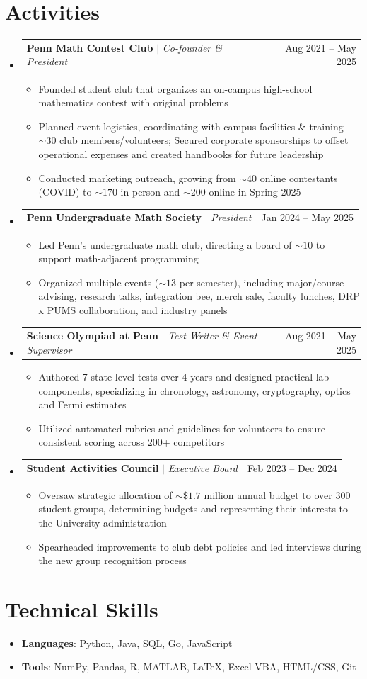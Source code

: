 \documentclass[letterpaper, 11pt]{article}
\makeatletter
\newcommand{\resumeItem}[1]{\item\small{#1 \vspace{-1.5pt}}}
\newcommand{\resumeProjectHeading}[2]{
	\item\begin{tabular*}{0.97\textwidth}{l@{\extracolsep{\fill}}r}
		\small#1 & #2 \\\end{tabular*}\vspace{-7pt}
}
\newcommand{\resumeSubHeadingListStart}{\begin{itemize}[leftmargin=0.05in, label={}]}
\newcommand{\resumeSubHeadingListEnd}{\end{itemize}}
\newcommand{\resumeItemListStart}{\begin{itemize}[leftmargin=0.2in]}
\newcommand{\resumeItemListEnd}{\end{itemize}\vspace{-10pt}}
\makeatother
\begin{document}
	\section{Activities}
	\resumeSubHeadingListStart
	\resumeProjectHeading
	{\textbf{Penn Math Contest Club} $|$ \footnotesize\emph{Co-founder \& President}}{Aug 2021 -- May 2025}
	\resumeItemListStart
	\resumeItem{Founded student club that organizes an on-campus high-school mathematics contest with original problems}
	\resumeItem{Planned event logistics, coordinating with campus facilities \& training $\sim\!30$ club members/volunteers; Secured corporate sponsorships to offset operational expenses and created handbooks for future leadership}
	\resumeItem{Conducted marketing outreach, growing from $\sim\!40$ online contestants (COVID) to $\sim\!170$ in-person and $\sim\!200$ online in Spring 2025}
	\resumeItemListEnd
	
	\resumeProjectHeading
	{\textbf{Penn Undergraduate Math Society} $|$ \footnotesize\emph{President}}{Jan 2024 -- May 2025}
	\resumeItemListStart
	\resumeItem{Led Penn's undergraduate math club, directing a board of $\sim\!10$ to support math-adjacent programming}
	\resumeItem{Organized multiple events ($\sim\!13$ per semester), including major/course advising, research talks, integration bee, merch sale, faculty lunches, DRP x PUMS collaboration, and industry panels}
	\resumeItemListEnd
	
	\resumeProjectHeading
	{\textbf{Science Olympiad at Penn} $|$ \footnotesize\emph{Test Writer \& Event Supervisor}}{Aug 2021 -- May 2025}
	\resumeItemListStart
	\resumeItem{Authored 7 state-level tests over 4 years and designed practical lab components, specializing in chronology, astronomy, cryptography, optics and Fermi estimates}
	\resumeItem{Utilized automated rubrics and guidelines for volunteers to ensure consistent scoring across $200$+ competitors}
	\resumeItemListEnd
	
	\resumeProjectHeading{\textbf{Student Activities Council} $|$ \footnotesize\emph{Executive Board}}{Feb 2023 -- Dec 2024}
	\resumeItemListStart
	\resumeItem{Oversaw strategic allocation of $\sim\!\$1.7$ million annual budget to over 300 student groups, determining budgets and representing their interests to the University administration}
	\resumeItem{Spearheaded improvements to club debt policies and led interviews during the new group recognition process}
	\resumeItemListEnd
	
	
	\resumeSubHeadingListEnd 
	\section{Technical Skills}
	\begin{itemize}[leftmargin=0.15in, label={}]
		\setlength\itemsep{-2pt}
		\small\item{\textbf{Languages}{: Python, Java, SQL, Go, JavaScript}}
		\small\item{\textbf{Tools}{: NumPy, Pandas, R, MATLAB, \LaTeX, Excel VBA, HTML/CSS, Git}}
	\end{itemize}	
\end{document}
